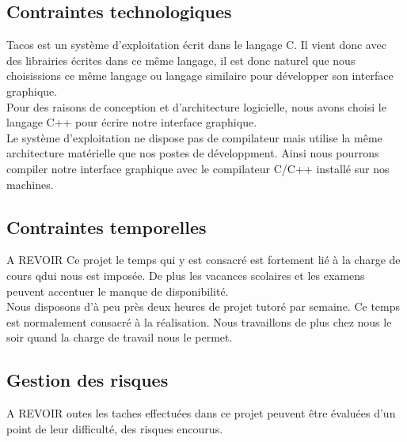 
\subsection{Contraintes technologiques}

Tacos est un système d'exploitation écrit dans le langage C. Il vient donc avec des librairies écrites dans ce même langage, il est donc naturel que nous choisissions ce même langage ou langage similaire pour développer son interface graphique. \\

Pour des raisons de conception et d'architecture logicielle, nous avons choisi le langage C++ pour écrire notre interface graphique. \\
Le système d'exploitation ne dispose pas de compilateur mais utilise la même architecture matérielle que nos postes de développment. Ainsi nous pourrons compiler notre interface graphique avec le compilateur C/C++ installé sur nos machines.

\subsection{Contraintes temporelles}

A REVOIR Ce projet le temps qui y est consacré est fortement lié à la charge de cours qdui nous est imposée. 
De plus les vacances scolaires et les examens peuvent accentuer le manque de disponibilité. \\

Nous disposons d'à peu près deux heures de projet tutoré par semaine. Ce temps est normalement consacré à la réalisation. Nous travaillons de plus chez nous le soir quand la charge de travail nous le permet.
\subsection{Gestion des risques}
A REVOIR outes les taches effectuées dans ce projet peuvent être évaluées d'un point de leur difficulté, des risques encourus.
